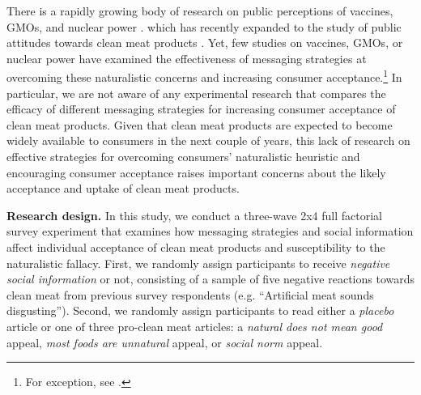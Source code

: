 \documentclass[12pt]{article}
\begin{document}
There is a rapidly growing body of research on public perceptions of vaccines, GMOs, and nuclear power \citep[see, e.g.,][]{Yaqub2014}. which has recently expanded to the study of public attitudes towards clean meat products \citep[e.g.][]{Wilks2017}. Yet, few studies on vaccines, GMOs, or nuclear power have examined the effectiveness of messaging strategies at overcoming these naturalistic concerns and increasing consumer acceptance.\footnote{For exception, see \citet{Nyhan2015,Nyhan2014}.} In particular, we are not aware of any experimental research that compares the efficacy of different messaging strategies for increasing consumer acceptance of clean meat products. Given that clean meat products are expected to become widely available to consumers in the next couple of years, this lack of research on effective strategies for overcoming consumers' naturalistic heuristic and encouraging consumer acceptance raises important concerns about the likely acceptance and uptake of clean meat products.





\textbf{Research design.} In this study, we conduct a three-wave 2x4 full factorial survey experiment that examines how messaging strategies and social information affect individual acceptance of clean meat products and susceptibility to the naturalistic fallacy. First, we randomly assign participants to receive \textit{negative social information} or not, consisting of a sample of five negative reactions towards clean meat from previous survey respondents (e.g. ``Artificial meat sounds disgusting''). Second, we randomly assign participants to read either a \textit{placebo} article or one of three pro-clean meat articles: a \textit{natural does not mean good} appeal, \textit{most foods are unnatural} appeal, or \textit{social norm} appeal.
\end{document}
